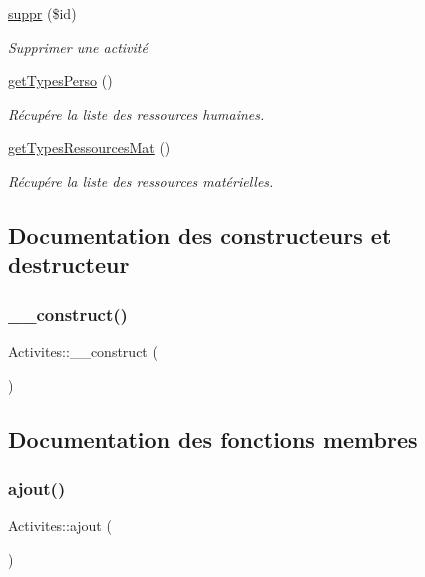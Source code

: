 \begin{DoxyCompactItemize}
\hyperlink{class_activites_a796b62ab25ed2c95932d47759b00013a}{suppr} (\$id)
\begin{DoxyCompactList}\small\item\em Supprimer une activité \end{DoxyCompactList}\item 
\hyperlink{class_activites_a1c472cf69b80e63303e6ec52f6d2a2f6}{get\+Types\+Perso} ()
\begin{DoxyCompactList}\small\item\em Récupére la liste des ressources humaines. \end{DoxyCompactList}\item 
\hyperlink{class_activites_aac89ad70171f46fd1efc8869334678a4}{get\+Types\+Ressources\+Mat} ()
\begin{DoxyCompactList}\small\item\em Récupére la liste des ressources matérielles. \end{DoxyCompactList}\end{DoxyCompactItemize}


\subsection{Documentation des constructeurs et destructeur}
\mbox{\label{class_activites_a18b43832d87f4b797b324dfdaa29171d}} 
\subsubsection{\texorpdfstring{\+\_\+\+\_\+construct()}{\_\_construct()}}
{\footnotesize\ttfamily Activites\+::\+\_\+\+\_\+construct (\begin{DoxyParamCaption}{ }\end{DoxyParamCaption})}



\subsection{Documentation des fonctions membres}
\mbox{\label{class_activites_a0be751d825f434bea7bf35d1fcd883f1}} 
\subsubsection{\texorpdfstring{ajout()}{ajout()}}
{\footnotesize\ttfamily Activites\+::ajout (\begin{DoxyParamCaption}{ }\end{DoxyParamCaption})}



